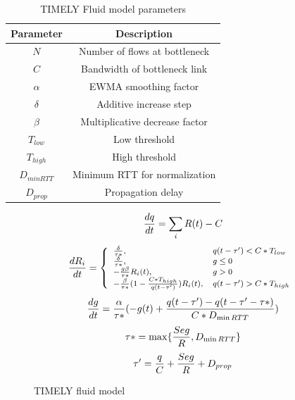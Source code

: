 \begin{table}[t]
\center
{
\footnotesize
{
\begin{tabular}{|c|c|} \hline
Parameter & Description \\ \hline
$N$ & Number of flows at bottleneck\\ \hline
$C$ & Bandwidth of bottleneck link\\ \hline
$\alpha$ & EWMA smoothing factor\\ \hline
$\delta$ & Additive increase step\\ \hline
$\beta$ & Multiplicative decrease factor\\ \hline
$T_{low}$ & Low threshold\\ \hline
$T_{high}$ & High threshold\\ \hline
$D_{minRTT}$ & Minimum RTT for normalization \\ \hline
$D_{prop}$ & Propagation delay \\ \hline
\end{tabular}
}
}
\caption{TIMELY Fluid model parameters}
\label{tab:timely_param}
\end{table}

\begin{figure}[h]
\fbox
{
\begin{minipage}{\columnwidth}
\begin{equation}
\small
\frac{{dq}}{{dt}} = \sum_{i} R(t) - C\\
\label{eq:timely_q}
\end{equation}
\begin{equation}
\small
\frac{{dR_i}}{{dt}} = \left\{ \begin{array}{ll}
\frac{\delta }{{\tau *}}, & q(t - \tau ') < C*{T_{low}}\\
\frac{\delta }{{\tau *}}, & g \le 0\\
 - \frac{{g\beta }}{{\tau *}}R_i(t), & g > 0\\
 - \frac{\beta }{{\tau *}}(1 - \frac{{C*{T_{high}}}}{{q(t - \tau ')}})R_i(t), & q(t - \tau ') > C*{T_{high}}
\end{array} \right.\\
\label{eq:timely_r}
\end{equation}
\begin{equation}
\small
\frac{{dg}}{{dt}} = \frac{\alpha }{{\tau *}}( - g(t) + \frac{{q(t - \tau ') - q(t - \tau ' - \tau *)}}{{C*{D_{\min RTT}}}})\\
\label{eq:timely_g}
\end{equation}
\begin{equation}
\small
\tau * = \max \{ \frac{{Seg}}{R},{D_{\min RTT}}\} \\
\label{eq:timely_taus}
\end{equation}
\begin{equation}
\small
\tau ' = \frac{q}{C} + \frac{{Seg}}{R} + {D_{prop}}
\label{eq:timely_taup}
\end{equation}
\end{minipage}
}
\caption{TIMELY fluid model}
\label{fig:timely_model}
\end{figure}

